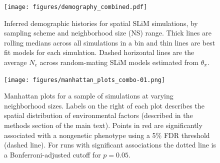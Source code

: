 \documentclass[10pt,twoside,lineno,hidelinks]{preprint} %
\providecommand{\DIFaddbegin}{} %
\providecommand{\DIFaddend}{} %
\providecommand{\DIFdelbegin}{} %
\providecommand{\DIFdelend}{} %
\begin{document}
\begin{figure}[p]
\centering
\texttt{[image: figures/demography\_combined.pdf]}
\caption{Inferred demographic histories for spatial SLiM simulations, by sampling scheme and neighborhood size (NS) range. Thick lines are rolling medians across all simulations in a bin and thin lines are best fit models for each simulation. Dashed horizontal lines are the average $N_{e}$ across random-mating SLiM models estimated from $\theta_{\pi}$.}
\label{fig:demography_supplement}
\end{figure}
\DIFaddbegin \FloatBarrier
\DIFaddend 

\DIFdelbegin %
\DIFdelend \begin{figure}[p]
\centering
\texttt{[image: figures/manhattan\_plots\_combo-01.png]}
\caption{Manhattan plots for a sample of simulations at varying neighborhood sizes. Labels on the right of each plot describes the spatial distribution of environmental factors (described in the methods section of the main text). Points in red are significantly associated with a nongenetic phenotype using a 5\% FDR threshold (dashed line). For runs with significant associations the dotted line is a Bonferroni-adjusted cutoff for $p=0.05$.}
\label{fig:manhattan_plots}
\end{figure}
\DIFaddbegin \FloatBarrier
\DIFaddend 
\end{document}
